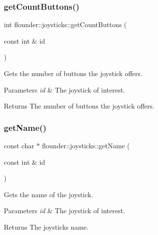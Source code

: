 \subsubsection{\texorpdfstring{get\+Count\+Buttons()}{getCountButtons()}}
{\footnotesize\ttfamily int flounder\+::joysticks\+::get\+Count\+Buttons (\begin{DoxyParamCaption}\item[{const int \&}]{id }\end{DoxyParamCaption})}



Gets the number of buttons the joystick offers. 


\begin{DoxyParams}{Parameters}
{\em id} & The joystick of interest. \\
\hline
\end{DoxyParams}
\begin{DoxyReturn}{Returns}
The number of buttons the joystick offers. 
\end{DoxyReturn}
\mbox{\label{classflounder_1_1joysticks_ae471533fed9714160b5af9e22b00c427}} 
\subsubsection{\texorpdfstring{get\+Name()}{getName()}}
{\footnotesize\ttfamily const char $\ast$ flounder\+::joysticks\+::get\+Name (\begin{DoxyParamCaption}\item[{const int \&}]{id }\end{DoxyParamCaption})}



Gets the name of the joystick. 


\begin{DoxyParams}{Parameters}
{\em id} & The joystick of interest. \\
\hline
\end{DoxyParams}
\begin{DoxyReturn}{Returns}
The joysticks name. 
\end{DoxyReturn}
\mbox{\label{classflounder_1_1joysticks_a6bb77cff38ccbdcdde66495afc538b1a}} 
